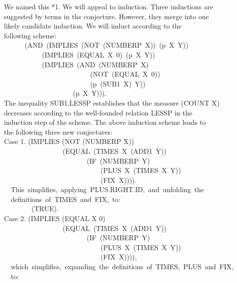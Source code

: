 \documentclass[10pt]{book}
\newenvironment{pubasis}{\begin{flushleft}}{\end{flushleft}}
\begin{document}
\begin{pubasis}
We named this *1.  We will appeal to induction.  Three inductions are\\
suggested by terms in the conjecture.  However, they merge into one\\
likely candidate induction.  We will induct according to the\\
following scheme:\\
~~~~~~(AND~(IMPLIES~(NOT~(NUMBERP~X))~(p~X~Y))\\
~~~~~~~~~~~(IMPLIES~(EQUAL~X~0)~(p~X~Y))\\
~~~~~~~~~~~(IMPLIES~(AND~(NUMBERP~X)\\
~~~~~~~~~~~~~~~~~~~~~~~~~(NOT~(EQUAL~X~0))\\
~~~~~~~~~~~~~~~~~~~~~~~~~(p~(SUB1~X)~Y))\\
~~~~~~~~~~~~~~~~~~~~(p~X~Y))).\\
The inequality SUB1.LESSP establishes that the measure (COUNT X)\\
decreases according to the well-founded relation LESSP in the\\
induction step of the scheme.  The above induction scheme leads to\\
the following three new conjectures:\\

Case 1.	(IMPLIES (NOT (NUMBERP X))\\
~~~~~~~~~~~~~~~~~(EQUAL~(TIMES~X~(ADD1~Y))\\
~~~~~~~~~~~~~~~~~~~~~~~~(IF~(NUMBERP~Y)\\
~~~~~~~~~~~~~~~~~~~~~~~~~~~~(PLUS~X~(TIMES~X~Y))\\
~~~~~~~~~~~~~~~~~~~~~~~~~~~~(FIX~X)))).\\

~~This~simplifies,~applying~PLUS.RIGHT.ID,~and~unfolding~the\\
~~definitions~of~TIMES~and~FIX,~to:\\

~~~~~~~~(TRUE).\\

Case 2.	(IMPLIES (EQUAL X 0)\\
~~~~~~~~~~~~~~~~~(EQUAL~(TIMES~X~(ADD1~Y))\\
~~~~~~~~~~~~~~~~~~~~~~~~(IF~(NUMBERP~Y)\\
~~~~~~~~~~~~~~~~~~~~~~~~~~~~(PLUS~X~(TIMES~X~Y))\\
~~~~~~~~~~~~~~~~~~~~~~~~~~~~(FIX~X)))),\\

~~which~simplifies,~expanding~the~definitions~of~TIMES,~PLUS~and~FIX,\\
~~to:\\


\end{pubasis}
\end{document}
